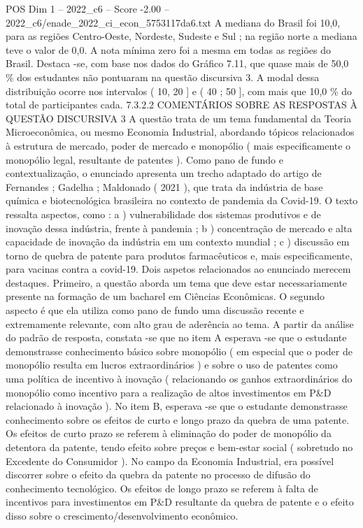 \begin{textsample}{POS Dim 1 – 2022\_c6 – Score -2.00 – 2022\_c6/enade\_2022\_ci\_econ\_5753117da6.txt}
A mediana do Brasil foi 10,0, para as regiões Centro-Oeste, Nordeste, Sudeste e Sul ; na região norte a mediana teve o valor de 0,0.
A nota mínima zero foi a mesma em todas as regiões do Brasil.
Destaca -se, com base nos dados do Gráfico 7.11, que quase mais de 50,0 \% dos estudantes não pontuaram na questão discursiva 3.
A modal dessa distribuição ocorre nos intervalos ( 10, 20 ] e ( 40 ; 50 ], com mais que 10,0 \% do total de participantes cada. 7.3.2.2 COMENTÁRIOS SOBRE AS RESPOSTAS À QUESTÃO DISCURSIVA 3 A questão trata de um tema fundamental da Teoria Microeconômica, ou mesmo Economia Industrial, abordando tópicos relacionados à estrutura de mercado, poder de mercado e monopólio ( mais especificamente o monopólio legal, resultante de patentes ).
Como pano de fundo e contextualização, o enunciado apresenta um trecho adaptado do artigo de Fernandes ; Gadelha ; Maldonado ( 2021 ), que trata da indústria de base química e biotecnológica brasileira no contexto de pandemia da Covid-19.
O texto ressalta aspectos, como : a ) vulnerabilidade dos sistemas produtivos e de inovação dessa indústria, frente à pandemia ; b ) concentração de mercado e alta capacidade de inovação da indústria em um contexto mundial ; c ) discussão em torno de quebra de patente para produtos farmacêuticos e, mais especificamente, para vacinas contra a covid-19.
Dois aspetos relacionados ao enunciado merecem destaques.
Primeiro, a questão aborda um tema que deve estar necessariamente presente na formação de um bacharel em Ciências Econômicas.
O segundo aspecto é que ela utiliza como pano de fundo uma discussão recente e extremamente relevante, com alto grau de aderência ao tema.
A partir da análise do padrão de resposta, constata -se que no item A esperava -se que o estudante demonstrasse conhecimento básico sobre monopólio ( em especial que o poder de monopólio resulta em lucros extraordinários ) e sobre o uso de patentes como uma política de incentivo à inovação ( relacionando os ganhos extraordinários do monopólio como incentivo para a realização de altos investimentos em P\&D relacionado à inovação ).
No item B, esperava -se que o estudante demonstrasse conhecimento sobre os efeitos de curto e longo prazo da quebra de uma patente.
Os efeitos de curto prazo se referem à eliminação do poder de monopólio da detentora da patente, tendo efeito sobre preços e bem-estar social ( sobretudo no Excedente do Consumidor ).
No campo da Economia Industrial, era possível discorrer sobre o efeito da quebra da patente no processo de difusão do conhecimento tecnológico.
Os efeitos de longo prazo se referem à falta de incentivos para investimentos em P\&D resultante da quebra de patente e o efeito disso sobre o crescimento/desenvolvimento econômico.

\end{textsample}
